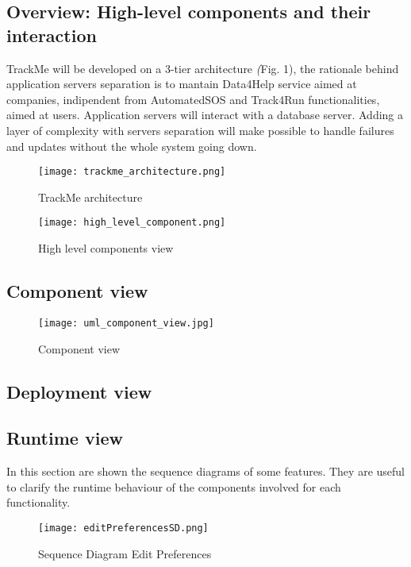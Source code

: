 \documentclass[../main.tex]{subfiles}
\begin{document}
\subsection{Overview: High-level components and their interaction}
 TrackMe will be developed on a 3-tier architecture \textit(Fig. 1), the rationale behind application servers separation 
 is to mantain Data4Help service aimed at companies, indipendent from AutomatedSOS and Track4Run functionalities, aimed at users. 
 Application servers will interact with a database server. 
 Adding a layer of complexity with servers separation will  make possible to handle failures and updates without the whole system going down.


\begin{figure}[ht]
\centering
     \texttt{[image: trackme\_architecture.png]}
      \caption{TrackMe architecture}
       \label{fig:trackme_architecture}
\end{figure}

\begin{figure}[ht]
    \centering
         \texttt{[image: high\_level\_component.png]}
          \caption{High level components view}
           \label{fig:high_level_components}
\end{figure}

\newpage
\thispagestyle{empty} %
\subsection{Component view}
\begin{figure}[H]
	\texttt{[image: uml\_component\_view.jpg]}
	\caption{Component view}
	\label{fig:uml_component_view}
\end{figure}
\newpage

\subsection{Deployment view}

\subsection{Runtime view}
In this section are shown the sequence diagrams of some features. They are useful to clarify the runtime behaviour of the components involved for each functionality.
\begin{figure}[h]
        \centering
             \texttt{[image: editPreferencesSD.png]}
              \caption{Sequence Diagram Edit Preferences }
               \label{fig:editPreferencesSD}
\end{figure}
\end{document}
